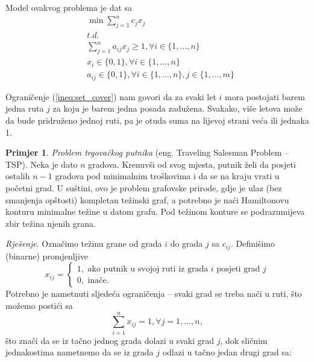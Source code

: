 \documentclass[a4paper, utf8, 11pt, colorlinks]{book}
\theoremstyle{definition}
\newtheorem{primjer}{Primjer}[chapter]
\begin{document}
Model ovakvog problema je dat sa 
\begin{align}
    &\min \sum_{j=1}^n c_j x_j \nonumber\\
    &t.d. \nonumber \\
    & \sum_{j=1}^n a_{ij} x_j \geq 1, \forall i \in \{1,\ldots, n\} \label{ineq:set_cover} \\
    & x_i \in \{0, 1 \}, \forall i \in \{1, \ldots, n\} \\
    & a_{ij} \in \{0, 1\}, \forall i \in \{1, \ldots, n\}, j \in\{1,\ldots, m\} \nonumber
\end{align}

Ograničenje (\ref{ineq:set_cover}) nam govori da za svaki let $i$ mora postojati barem jedna ruta $j$ za koju je barem jedna posada zadužena. Svakako,  više letova može da bude pridruženo jednoj ruti, pa je otuda suma na lijevoj strani veća ili jednaka 1. 
\begin{primjer}
\emph{Problem trgovačkog putnika} (eng.  {Traveling Salesman Problem -- TSP)}. Neka je dato $n$ gradova. Krenuvši od svog mjesta, putnik želi da posjeti ostalih $n-1$ gradova pod minimalnim troškovima i da se na kraju vrati u početni grad. U suštini, ovo je problem grafovske prirode, gdje je ulaz (bez smanjenja opštosti) kompletan težinski graf, a potrebno je naći Hamiltonovu konturu minimalne težine u datom grafu. Pod težinom konture se podrazumijeva zbir težina njenih grana. 
\end{primjer}
\emph{Rješenje}. Označimo težinu grane od grada $i$ do grada $j$ sa $c_{ij}$.  Definišimo (binarne) promjenljive 
$$x_{ij} = \begin{cases}
                1, \mbox{ ako putnik u svojoj ruti iz grada } i \mbox{ posjeti grad } j \\
                0, \mbox{ inače}. 
          \end{cases}$$ 
Potrebno je nametnuti sljedeća ograničenja -- svaki grad se treba naći u ruti,  što možemo postići sa 
$$  \sum_{i=1}^n x_{ij} = 1, \forall j =1,\ldots, n,$$ 
što znači da se iz tačno jednog grada dolazi u svaki grad $j$, dok sličnim jednakostima nametnemo da se iz grada $j$ odlazi u tačno jedan drugi grad sa:
\end{document}
